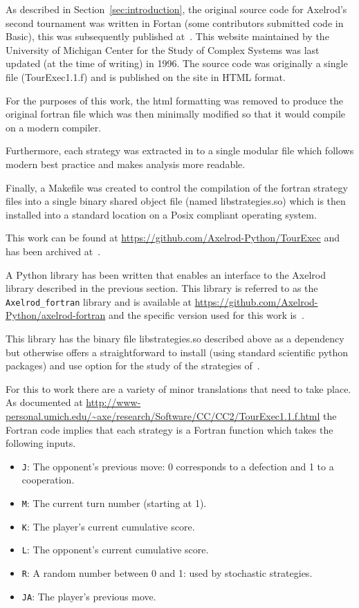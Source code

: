 \documentclass{article}
\begin{document}
As described in Section~\ref{sec:introduction}, the original source code for
Axelrod's second tournament was written in Fortan (some contributors submitted
code in Basic), this was subsequently published at~\cite{Axelrod1980bCode}. This
website maintained by the University of Michigan Center for the Study of Complex
Systems was last updated (at the time of writing) in 1996. The source code was
originally a single file (TourExec1.1.f) and is published on the site in HTML format.

For the purposes of this work, the html formatting was removed to produce the original
fortran file which was then minimally modified so that it would compile on a modern
compiler.  

Furthermore, each strategy was extracted in to a single modular file which
follows modern best practice and makes analysis more readable.

Finally, a Makefile was created to control the compilation of the fortran
strategy files into a single binary shared object file (named libstrategies.so)
which is then installed into a standard location on a Posix compliant operating system.

This work can be found
at \url{https://github.com/Axelrod-Python/TourExec} and has been archived
at~\cite{TourExec}.

A Python library has been written that enables an interface to
the Axelrod library described in the previous section. This library is referred
to as the \texttt{Axelrod\_fortran} library and is available
at \url{https://github.com/Axelrod-Python/axelrod-fortran} and the specific
version used for this work is~\cite{Axelrod_fortran}.

This library has the binary file libstrategies.so described above as a dependency but
otherwise offers a straightforward to install (using standard scientific python
packages) and use option for the study of
the strategies of~\cite{Axelrod1980b}.

For this to work there are a variety of minor translations that need to take
place. As documented at
\url{http://www-personal.umich.edu/~axe/research/Software/CC/CC2/TourExec1.1.f.html}
the Fortran code implies that each strategy is a Fortran function which takes
the following inputs.

\begin{itemize}
    \item  \texttt{J}: The opponent's previous move: 0 corresponds to a
        defection and 1 to a cooperation.
    \item \texttt{M}: The current turn number (starting at 1).
    \item \texttt{K}: The player's current cumulative score.
    \item \texttt{L}: The opponent's current cumulative score.
    \item \texttt{R}: A random number between 0 and 1: used by stochastic
        strategies.
    \item \texttt{JA}: The player's previous move.
\end{itemize}
\end{document}
